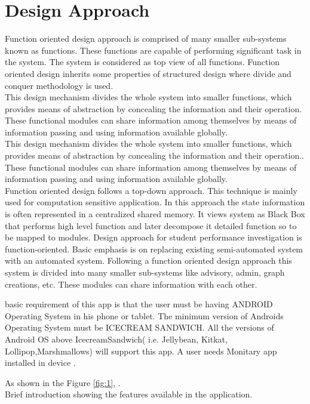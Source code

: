 
\section{Design Approach}

Function oriented design approach is comprised of many smaller sub-systems known as functions. These functions are capable of performing significant task in the system. The system is considered as top view of all functions.
Function oriented design inherits some properties of structured design where divide and conquer methodology is used.\\

This design mechanism divides the whole system into smaller functions, which provides means of abstraction by concealing the information and their operation. These functional modules can share information among themselves by means of information passing and using information available globally.\\

This design mechanism divides the whole system into smaller functions, which provides means of abstraction by concealing the information and their operation.. These functional modules can share information among themselves by means of information passing and using information available globally.\\

Function oriented design follows a top-down approach. This technique is mainly used for computation sensitive application. In this approach the state information is often represented in a centralized shared memory. It views system as Black Box that performs high level function and later decompose it detailed function so to be mapped to modules.
Design approach for student performance investigation is function-oriented. Basic emphasis is on replacing existing semi-automated system with an automated system. Following a function oriented design approach this system is divided into many smaller sub-systems like advisory, admin, graph creations, etc. These modules can share information with each other. 


\iffalse
 basic requirement of this app is that the user must be having ANDROID
Operating System in his phone or tablet. The minimum version of Androids Operating
System must be ICECREAM SANDWICH. All the versions of Android OS above
IcecreamSandwich( i.e. Jellybean, Kitkat, Lollipop,Marshmallows) will support this
app. A user needs Monitary app installed in device .


\noindent As shown in the Figure \ref{fig:1}, .\\Brief introduction showing the features available in the application.

